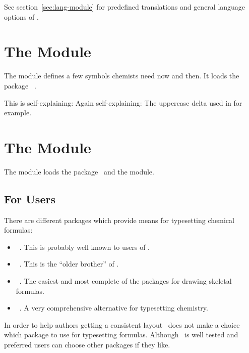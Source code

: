 \documentclass{chemmacros-manual}
\begin{document}
See section~\vref{sec:lang-module} for predefined translations and general
language options of \chemmacros.

\section{The  Module}\label{sec:symbols-module}

The  module defines a few symbols chemists need now and
then.  It loads the package ~\cite{pkg:amstext}.
\begin{commands}
    This is self-explaining: \transitionstatesymbol
    Again self-explaining: \standardstate
    The uppercase delta used in  for example.
\end{commands}

\section{The  Module}\label{sec:chemformula-module}

The  module loads the 
package~\cite{pkg:amstext} and the  module.

\subsection{For Users}
There are different packages which provide means for typesetting chemical
formulas:
\begin{itemize}
  \item {}~\cite{pkg:chemformula}.  This is probably well known
    to users of \chemmacros.
  \item {}~\cite{pkg:mhchem}.  This is the \enquote{older brother} of
    \chemformula.
  \item {}~\cite{pkg:chemfig}.  The easiest and most complete of the
    packages for drawing skeletal formulas.
  \item \XyMTeX~\cite{pkg:xymtex}.  A very comprehensive alternative for
    typesetting chemistry.
\end{itemize}
In order to help authors getting a consistent layout \chemmacros\ does not
make a choice which package to use for typesetting formulas.  Although
\chemformula\ is well tested and preferred users can choose other packages if
they like.
\end{document}
